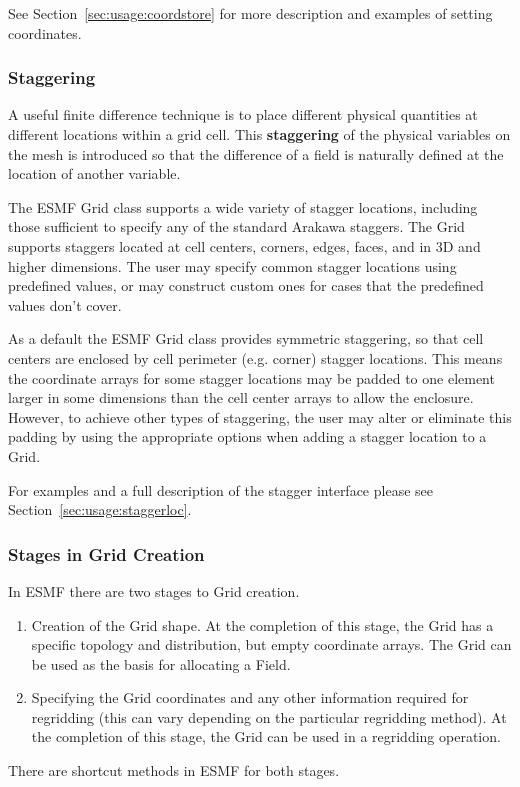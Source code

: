 See Section~\ref{sec:usage:coordstore} for more description and examples of
setting coordinates.

\subsubsection{Staggering}

A useful finite difference technique is to place different physical
quantities at different locations within a grid cell. This {\bf staggering}
of the physical variables on the mesh is introduced so that the difference
of a field is naturally defined at the location of another variable. 

The ESMF Grid class supports a wide variety of stagger locations, including
those sufficient to specify any of the standard Arakawa staggers. The 
Grid supports staggers located at cell centers, corners, edges, 
faces, and in 3D and higher dimensions. The user may specify
common stagger locations using predefined values, or may construct
custom ones for cases that the predefined values don't cover.

As a default the ESMF Grid class provides symmetric staggering, so
that cell centers are enclosed by cell perimeter (e.g. corner) 
stagger locations. This means the coordinate arrays for
some stagger locations may be padded to one element larger in some
dimensions than the cell center arrays to allow the enclosure. 
However, to achieve other types of staggering, the user may alter 
or eliminate this padding by using the appropriate options when adding
a stagger location to a Grid. 
 
For examples and a full description of the stagger interface 
please see Section~\ref{sec:usage:staggerloc}. 

\subsubsection{Stages in Grid Creation} 
\label{sec:gridcreatestages}

In ESMF there are two stages to Grid creation.
\begin{enumerate}
\item Creation of the Grid shape.  At the completion of this
stage, the Grid has a specific topology and distribution, but
empty coordinate arrays.  The Grid can be used as the basis for
allocating a Field.
\item Specifying the Grid coordinates and any other information
required for regridding (this can vary depending on the particular
regridding method).  At the completion of this stage, the Grid can
be used in a regridding operation.
\end{enumerate}
There are shortcut methods in ESMF for both stages.

